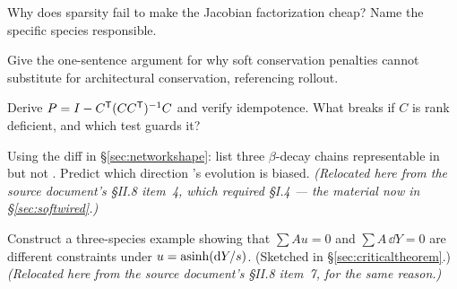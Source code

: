 \begin{selfcheck}
\item Why does sparsity fail to make the Jacobian factorization cheap? Name the
      specific species responsible.
\item Give the one-sentence argument for why soft conservation penalties cannot
      substitute for architectural conservation, referencing rollout.
\item Derive $P = I - C^{\mathsf{T}}(CC^{\mathsf{T}})^{-1}C$ and verify idempotence. What breaks if
      $C$ is rank deficient, and which test guards it?
\item Using the diff in \S\ref{sec:networkshape}: list three $\beta$-decay
      chains representable in  but not . Predict which
      direction 's \Ye{} evolution is biased.
      \emph{(Relocated here from the source document's \S II.8 item~4, which
      required \S I.4 --- the material now in \S\ref{sec:softwired}.)}
      \label{sc:mesadiff}
\item Construct a three-species example showing that $\sum A u = 0$ and
      $\sum A\,\dd Y = 0$ are different constraints under $u = \operatorname{asinh}(\mathrm{d} Y/s)$.
      (Sketched in \S\ref{sec:criticaltheorem}.)
      \emph{(Relocated here from the source document's \S II.8 item~7, for the
      same reason.)}
\end{selfcheck}
